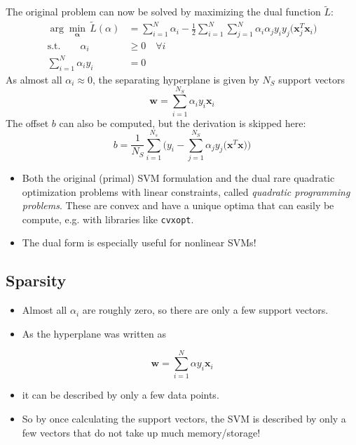 \documentclass[a4paper, 11pt, accentcolor = tud3b]{tudreport}
\renewcommand{\vec}[1]{\mathbf{#1}}
\begin{document}
					The original problem can now be solved by maximizing the dual function \(\tilde{L}\):
					\begin{align}
						\arg\min_{ \vec{\alpha} } \, \tilde{L}(\alpha) &= \sum_{i = 1}^{N} \alpha_i - \frac{1}{2} \sum_{i = 1}^{N} \sum_{j = 1}^{N} \alpha_i \alpha_j y_i y_j \big(\vec{x}_j^T \vec{x}_i\big) \\
						\textrm{s.t.} \qquad
						\alpha_i &\geq 0 \quad\forall i \\
						\sum_{i = 1}^{N} \alpha_i y_i &= 0
					\end{align}
					As almost all \(\alpha_i \approx 0\), the separating hyperplane is given by \(N_S\) support vectors
					\begin{equation}
						\vec{w} = \sum_{i = 1}^{N_S} \alpha_i y_i \vec{x}_i
					\end{equation}
					The offset \(b\) can also be computed, but the derivation is skipped here:
					\begin{equation}
						b = \frac{1}{N_S} \sum_{i = 1}^{N_s} \Bigg( y_i - \sum_{j = 1}^{N_S} \alpha_j y_j \big( \vec{x}^T \vec{x} \big) \Bigg)
					\end{equation}
					
					\begin{itemize}
						\item Both the original (primal) SVM formulation and the dual rare quadratic optimization problems with linear constraints, called \emph{quadratic programming problems}. These are convex and have a unique optima that can easily be compute, e.g. with libraries like \texttt{cvxopt}.
						\item The dual form is especially useful for nonlinear SVMs!
					\end{itemize}

			\subsection{Sparsity}
				\begin{itemize}
					\item Almost all \(\alpha_i\) are roughly zero, so there are only a few support vectors.
					\item As the hyperplane was written as
				\end{itemize}
				\begin{equation}
					\vec{w} = \sum_{i = 1}^{N} \alpha y_i \vec{x}_i \label{eq:svmW}
				\end{equation}
				\begin{itemize}
					\item[] it can be described by only a few data points.
					\item So by once calculating the support vectors, the SVM is described by only a few vectors that do not take up much memory/storage!
				\end{itemize}
\end{document}
